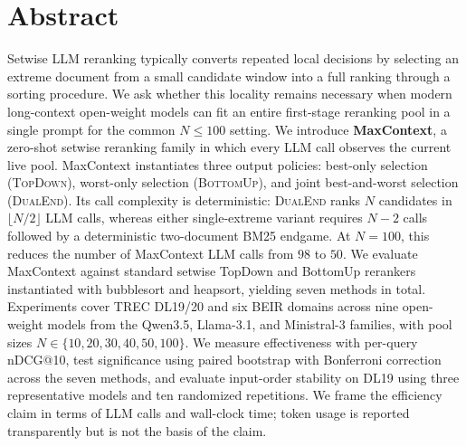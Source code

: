 \section{Abstract}
\label{sec:abstract}

Setwise LLM reranking typically converts repeated local decisions by selecting an extreme document from a small candidate window into a full ranking through a sorting procedure.
We ask whether this locality remains necessary when modern long-context open-weight models can fit an entire first-stage reranking pool in a single prompt for the common $N \le 100$ setting.
We introduce \textbf{MaxContext}, a zero-shot setwise reranking family in which every LLM call observes the current live pool.
MaxContext instantiates three output policies: best-only selection (\textsc{TopDown}), worst-only selection (\textsc{BottomUp}), and joint best-and-worst selection (\textsc{DualEnd}). Its call complexity is deterministic: \textsc{DualEnd} ranks $N$ candidates in $\lfloor N/2 \rfloor$ LLM calls, whereas either single-extreme variant requires $N{-}2$ calls followed by a deterministic two-document BM25 endgame.
At $N{=}100$, this reduces the number of MaxContext LLM calls from $98$ to $50$.
We evaluate MaxContext against standard setwise TopDown and BottomUp rerankers instantiated with bubblesort and heapsort, yielding seven methods in total.
Experiments cover TREC DL19/20 and six BEIR domains across nine open-weight models from the Qwen3.5, Llama-3.1, and Ministral-3 families, with pool sizes $N \in \{10,20,30,40,50,100\}$.
We measure effectiveness with per-query nDCG@10, test significance using paired bootstrap with Bonferroni correction across the seven methods, and evaluate input-order stability on DL19 using three representative models and ten randomized repetitions.
We frame the efficiency claim in terms of LLM calls and wall-clock time; token usage is reported transparently but is not the basis of the claim.